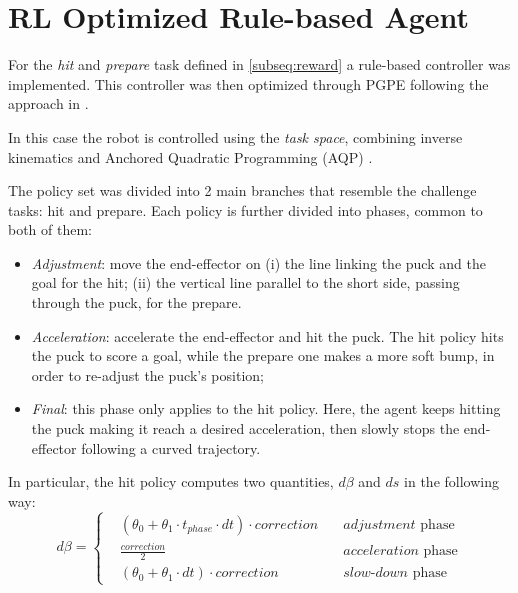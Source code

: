 \section{RL Optimized Rule-based Agent}
\label{sec:rule-based_agent}

For the \textit{hit} and \textit{prepare} task defined in \ref{subseq:reward} a rule-based controller was implemented.
This controller was then optimized through PGPE \cite{PGPE} following the approach in \cite{PGPE_Likmeta}.

In this case the robot is controlled using the \textit{task space}, combining inverse kinematics and Anchored Quadratic Programming (AQP) \cite{baseline}.

The policy set was divided into 2 main branches that resemble the challenge tasks: hit and prepare. Each policy is
further divided into phases, common to both of them:
\begin{itemize}
    \item \textit{Adjustment}: move the end-effector on (i) the line linking the puck and the goal for the hit; (ii) the vertical line
    parallel to the short side, passing through the puck, for the prepare.
    \item \textit{Acceleration}: accelerate the end-effector and hit the puck. The hit policy hits the puck to score a goal, while
    the prepare one makes a more soft bump, in order to re-adjust the puck's position;
    \item \textit{Final}: this phase only applies to the hit policy. Here, the agent keeps hitting the puck making it reach a desired
    acceleration, then slowly stops the end-effector following a curved trajectory.
\end{itemize}

In particular, the hit policy computes two quantities, $d\beta$ and $ds$ in the following way:
\begin{equation*}
    d\beta = \left\{
        \begin{aligned}
            &(\theta_0 + \theta_1 \cdot t_{phase} \cdot dt) \cdot correction \quad & adjustment \text{ phase}\\
            &\frac{correction}{2}                                            \quad & acceleration \text{ phase}\\
            &(\theta_0 + \theta_1 \cdot dt) \cdot correction                 \quad & slow\text{-}down \text{ phase}
        \end{aligned}
    \right.
\end{equation*}

